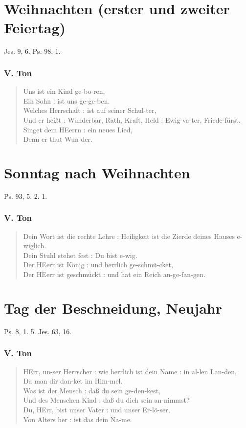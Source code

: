 \section[Weihnachten]{Weihnachten (erster und zweiter Feiertag)}

Jes. 9, 6. Ps. 98, 1.

\subsubsection{V. Ton}
\begin{verse}
Uns ist ein Kind ge-bo-ren,\\
Ein Sohn : ist uns ge-ge-ben.\\
Welches Herrschaft : ist auf seiner Schul-ter,\\
Und er heißt : Wunderbar, Rath, Kraft, Held : Ewig-va-ter, Friede-fürst.\\
Singet dem HEerrn : ein neues Lied,\\
Denn er thut Wun-der.
\end{verse}

\section{Sonntag nach Weihnachten}

Ps. 93, 5. 2. 1.

\subsubsection{V. Ton}
\begin{verse}
Dein Wort ist die rechte Lehre : Heiligkeit ist die Zierde deines Hauses e-wiglich.\\
Dein Stuhl stehet fest : Du bist e-wig.\\
Der HEerr ist König : und herrlich ge-schmü-cket,\\
Der HEerr ist geschmückt : und hat ein Reich an-ge-fan-gen.
\end{verse}

\section{Tag der Beschneidung, Neujahr}

Ps. 8, 1. 5. Jes. 63, 16.

\subsubsection{V. Ton}
\begin{verse}
HErr, un-ser Herrscher : wie herrlich ist dein Name : in al-len Lan-den,\\
Da man dir dan-ket im Him-mel.\\
Was ist der Mensch : daß du sein ge-den-kest,\\
Und des Menschen Kind : daß du dich sein an-nimmst?\\
Du, HErr, bist unser Vater : und unser Er-lö-ser,\\
Von Alters her : ist das dein Na-me.
\end{verse}

